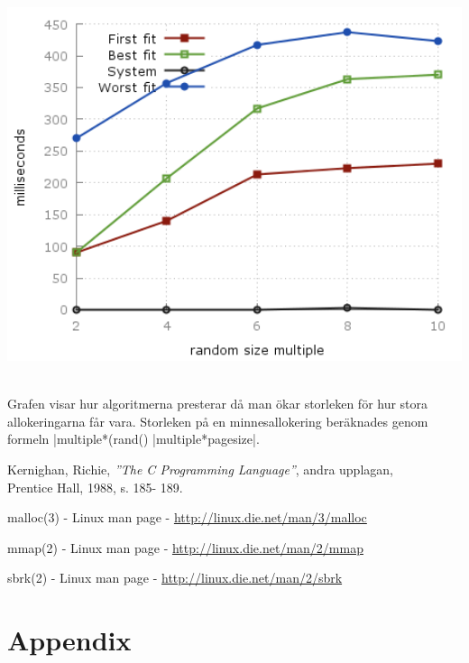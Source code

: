 \documentclass[paper=a4, fontsize=11pt]{scrartcl} %
\numberwithin{equation}{section} %
\numberwithin{figure}{section} %
\numberwithin{table}{section} %
\begin{document}
\begin{minipage}{.5\textwidth}
    \centering
    \includegraphics[width=1\textwidth]{images/time_plot_rand.png}
    \label{fig:p3}
\end{minipage}\\

Grafen visar hur algoritmerna presterar då man ökar storleken för hur stora
allokeringarna får vara.
Storleken på en minnesallokering beräknades genom formeln
|multiple*(rand()%
|multiple*pagesize|.


\renewcommand{\refname}{\normalfont\selectfont\normalsize Referenser} 
\newpage
\begin{thebibliography}{9}

Kernighan, Richie, 
\emph{''The C Programming Language''},
 andra upplagan,\\ Prentice Hall, 
 1988,
 s. 185- 189.

malloc(3) - Linux man page -
\url{http://linux.die.net/man/3/malloc}

mmap(2) - Linux man page -
\url{http://linux.die.net/man/2/mmap}

sbrk(2) - Linux man page -
\url{http://linux.die.net/man/2/sbrk}


\end{thebibliography}


\newpage
\section*{Appendix}
\end{document}

